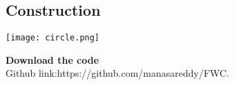\documentclass[10pt,a4paper]{report}
\begin{document}
\begin{multicols}{2}
\section{Construction}
\texttt{[image: circle.png]}  

 \textbf{Download the code} \\
Github link:{https://github.com/manasareddy/FWC}.
  \end{multicols}
\end{document}
